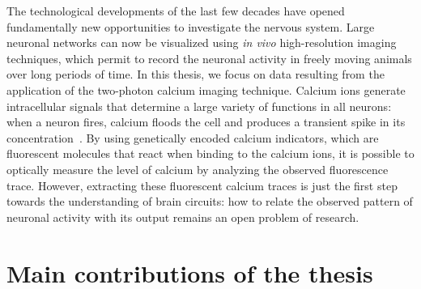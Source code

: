 The technological developments of the last few decades have opened fundamentally new opportunities to investigate the nervous system. Large neuronal networks can now be visualized using \textit{in vivo} high-resolution imaging techniques, which permit to record the neuronal activity in freely moving animals over long periods of time. In this thesis, we focus on data resulting from the application of the two-photon calcium imaging technique. Calcium ions generate intracellular signals that determine a large variety of functions in all neurons: when a neuron fires, calcium floods the cell and produces a transient spike in its concentration~\citep{grienberger2012}. By using genetically encoded calcium indicators, which are fluorescent molecules that react when binding to the calcium ions, it is possible to optically measure the level of calcium by analyzing the observed fluorescence trace. 
However, extracting these fluorescent calcium traces is just the first step towards the understanding of brain circuits: how to relate the observed pattern of neuronal activity with its output remains an open problem of research.



{}
\section*{Main contributions of the thesis}


\noindent

